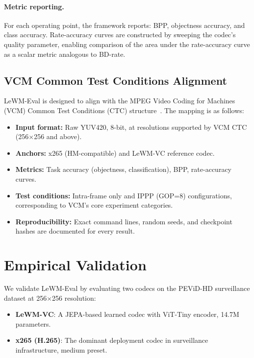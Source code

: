 \documentclass{article}
\begin{document}
\paragraph{Metric reporting.}
For each operating point, the framework reports: BPP, objectness accuracy, and class accuracy. Rate-accuracy curves are constructed by sweeping the codec's quality parameter, enabling comparison of the area under the rate-accuracy curve as a scalar metric analogous to BD-rate.

\subsection{VCM Common Test Conditions Alignment}

LeWM-Eval is designed to align with the MPEG Video Coding for Machines (VCM) Common Test Conditions (CTC) structure~\cite{MPEG2023VCM}. The mapping is as follows:

\begin{itemize}
\item \textbf{Input format:} Raw YUV420, 8-bit, at resolutions supported by VCM CTC (256$\times$256 and above).
\item \textbf{Anchors:} x265 (HM-compatible) and LeWM-VC reference codec.
\item \textbf{Metrics:} Task accuracy (objectness, classification), BPP, rate-accuracy curves.
\item \textbf{Test conditions:} Intra-frame only and IPPP (GOP=8) configurations, corresponding to VCM's core experiment categories.
\item \textbf{Reproducibility:} Exact command lines, random seeds, and checkpoint hashes are documented for every result.
\end{itemize}

\section{Empirical Validation}
\label{sec:results}

We validate LeWM-Eval by evaluating two codecs on the PEViD-HD surveillance dataset at 256$\times$256 resolution:

\begin{itemize}
\item \textbf{LeWM-VC}: A JEPA-based learned codec with ViT-Tiny encoder, 14.7M parameters.
\item \textbf{x265 (H.265)}: The dominant deployment codec in surveillance infrastructure, medium preset.
\end{itemize}
\end{document}
